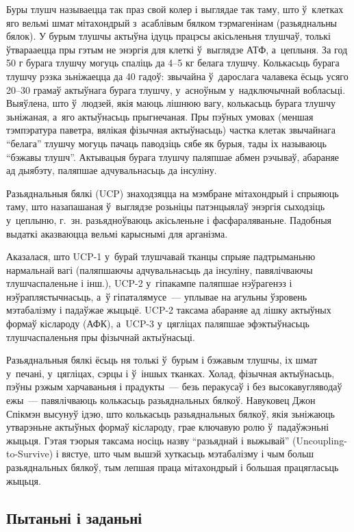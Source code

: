 Буры тлушч называецца так праз свой колер і выглядае так таму, што ў~клетках яго вельмі шмат мітахондрый з~асаблівым бялком тэрмагенінам (разьяднальны бялок). У бурым тлушчы актыўна ідуць працэсы акісьленьня тлушчаў, толькі ўтварааецца пры гэтым не энэргія для клеткі ў~выглядзе АТФ, а~цеплыня. За год 50 г бурага тлушчу могуць спаліць да 4--5 кг белага тлушчу. Колькасьць бурага тлушчу рэзка зьніжаецца да 40 гадоў: звычайна ў~дарослага чалавека ёсьць усяго 20--30 грамаў актыўнага бурага тлушчу, у~асноўным у~надключычнай вобласьці. Выяўлена, што ў~людзей, якія маюць лішнюю вагу, колькасьць бурага тлушчу зьніжаная, а~яго актыўнасьць прыгнечаная. Пры пэўных умовах (меншая тэмпэратура паветра, вялікая фізычная актыўнасьць) частка клетак звычайнага ``белага'' тлушчу могуць пачаць паводзіць сябе як бурыя, тады іх называюць ``бэжавы тлушч''. Актывацыя бурага тлушчу паляпшае абмен рэчываў, абараняе ад дыябэту, паляпшае адчувальнасьць да інсуліну.

Разьяднальныя бялкі (UCP) знаходзяцца на мэмбране мітахондрый і спрыяюць таму, што назапашаная ў~выглядзе розьніцы патэнцыялаў энэргія сыходзіць у~цеплыню, г.~зн. разьядноўваюць акісьленьне і фасфараляваньне. Падобныя выдаткі аказваюцца вельмі карыснымі для арганізма.

Аказалася, што UCP-1 у~бурай тлушчавай тканцы спрыяе падтрыманьню нармальнай вагі (паляпшаючы адчувальнасьць да інсуліну, павялічваючы тлушчаспаленьне і інш.), UCP-2 у~гіпакампе паляпшае нэўрагенэз і нэўраплястычнасьць, а~ў гіпаталямусе~--- уплывае на агульны ўзровень мэтабалізму і падаўжае жыцьцё. UCP-2 таксама абараняе ад лішку актыўных формаў кіслароду (АФК), а~UCP-3 у~цягліцах паляпшае эфэктыўнасьць тлушчаспаленьня пры фізычнай актыўнасьці.

Разьяднальныя бялкі ёсьць ня толькі ў~бурым і бэжавым тлушчы, іх шмат у~печані, у~цягліцах, сэрцы і ў~іншых тканках. Холад, фізычная актыўнасьць, пэўны рэжым харчаваньня і прадукты~--- безь перакусаў і без высокавугляводаў ежы~--- павялічваюць колькасьць разьяднальных бялкоў. Навуковец Джон Спікмэн высунуў ідэю, што колькасьць разьяднальных бялкоў, якія зьніжаюць утварэньне актыўных формаў кіслароду, грае ключавую ролю ў~падаўжэньні жыцьця. Гэтая тэорыя таксама носіць назву ``разьяднай і выжывай'' (Uncoupling-to-Survive) і вястуе, што чым вышэй хуткасьць мэтабалізму і чым больш разьяднальных бялкоў, тым лепшая праца мітахондрый і большая працягласьць жыцьця.

\subsection*{Пытаньні і заданьні}


